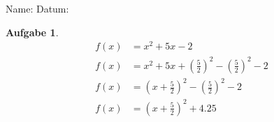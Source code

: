 \documentclass[12pt]{article}
\theoremstyle{note}
\newtheorem{aufgabe}{Aufgabe}
\begin{document}
 
    \begin{flushleft}
Name: \hspace{12cm} Datum:\begin{aufgabe} ~ \\ 
\begin{align} 
f(x)&=x^{2} + 5 x - 2 \\ 
f(x)&=x^{2}+5x+ \left(\frac{5}{2}\right)^2 - \left( \frac{5}{2}\right) ^2 -2 \\ 
f(x)&=(x+\frac{5}{2})^2- \left( \frac{5}{2}\right) ^2 -2 \\ 
f(x)&=(x+\frac{5}{2})^2+4.25\end{align} 
\end{aufgabe} 
\end{flushleft} 
    
\end{document}
